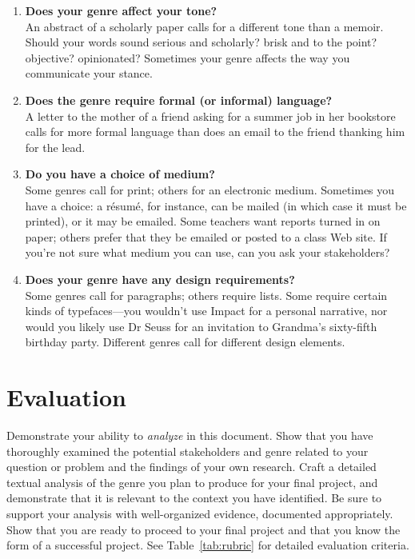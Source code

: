 \documentclass[11pt, twosides]{amsart}	%
\begin{document}
\begin{enumerate}
\begin{enumerate}
\item \textbf{Does your genre affect your tone?}\\ An abstract of a scholarly paper calls for a different tone than a memoir. Should your words sound serious and scholarly? brisk and to the point? objective? opinionated? Sometimes your genre affects the way you communicate your stance.
\item \textbf{Does the genre require formal (or informal) language?}\\ A letter to the mother of a friend asking for a summer job in her bookstore calls for more formal language than does an email to the friend thanking him for the lead.
\item \textbf{Do you have a choice of medium?}\\ Some genres call for print; others for an electronic medium. Sometimes you have a choice: a résumé, for instance, can be mailed (in which case it must be printed), or it may be emailed. Some teachers want reports turned in on paper; others prefer that they be emailed or posted to a class Web site. If you’re not sure what medium you can use, can you ask your stakeholders?
\item \textbf{Does your genre have any design requirements?}\\ Some genres call for paragraphs; others require lists. Some require certain kinds of typefaces—you wouldn’t use Impact for a personal narrative, nor would you likely use Dr Seuss for an invitation to Grandma’s sixty-fifth birthday party. Different genres call for different design elements.
		\end{enumerate}
	\end{enumerate} %


\section{Evaluation} %
\label{sec:eval}
Demonstrate your ability to \emph{analyze} in this document. Show that you have thoroughly examined the potential stakeholders and genre related to your question or problem and the findings of your own research. Craft a detailed textual analysis of the genre you plan to produce for your final project, and demonstrate that it is relevant to the context you have identified. Be sure to support your analysis with well-organized evidence, documented appropriately. Show that you are ready to proceed to your final project and that you know the form of a successful project. See Table~\ref{tab:rubric} for detailed evaluation criteria.
\end{document}
